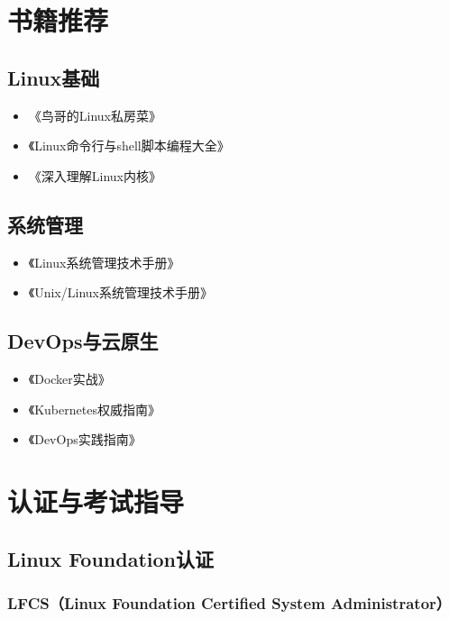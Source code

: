 \documentclass[12pt,UTF8]{ctexbook}
\begin{document}
\section{书籍推荐}
\label{sec:books}

\subsection*{Linux基础}

\begin{itemize}
    \item 《鸟哥的Linux私房菜》
    \item 《Linux命令行与shell脚本编程大全》
    \item 《深入理解Linux内核》
\end{itemize}

\subsection*{系统管理}

\begin{itemize}
    \item 《Linux系统管理技术手册》
    \item 《Unix/Linux系统管理技术手册》
\end{itemize}

\subsection*{DevOps与云原生}

\begin{itemize}
    \item 《Docker实战》
    \item 《Kubernetes权威指南》
    \item 《DevOps实践指南》
\end{itemize}

\section{认证与考试指导}
\label{sec:certification}

\subsection*{Linux Foundation认证}

\subsubsection*{LFCS（Linux Foundation Certified System Administrator）}
\end{document}
